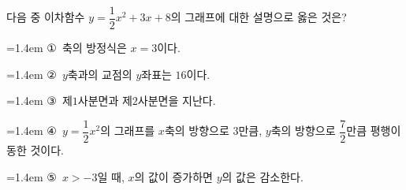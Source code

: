 다음 중 이차함수 $y=\dfrac{1}{2}x^2+3x+8$의 그래프에 대한 설명으로 옳은 것은?
\par\medskip\par\noindent\hangindent=1.4em {\small ①}\ 축의 방정식은 $x=3$이다.\par\noindent\hangindent=1.4em {\small ②}\ $y$축과의 교점의 $y$좌표는 $16$이다.\par\noindent\hangindent=1.4em {\small ③}\ 제$1$사분면과 제$2$사분면을 지난다.\par\noindent\hangindent=1.4em {\small ④}\ $y=\dfrac{1}{2}x^2$의 그래프를 $x$축의 방향으로 $3$만큼, $y$축의 방향으로 $\dfrac{7}{2}$만큼 평행이동한 것이다.\par\noindent\hangindent=1.4em {\small ⑤}\ $x>-3$일 때, $x$의 값이 증가하면 $y$의 값은 감소한다.\par\medskip
